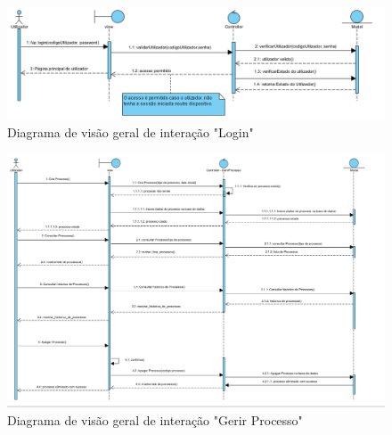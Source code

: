 \begin{figure}[!h]
\centering
\includegraphics[width=1.1\textwidth]{Figuras/d. visão geral de interação_login.png}
\caption{Diagrama de visão geral de interação "Login"}
\label{d.componentes}
\end{figure}

\begin{figure}[!h]
\centering
\includegraphics[width=1.1\textwidth]{Figuras/d. visão geral de interação_Gerir Processos.png}
\caption{Diagrama de visão geral de interação "Gerir Processo"}
\label{d.componentes}
\end{figure}

\clearpage
